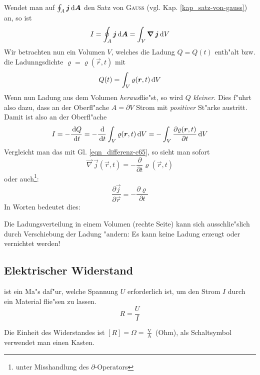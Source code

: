 Wendet man auf $\oint_A \boldsymbol{j} \, \mathrm{d} \boldsymbol{A}$ den Satz von
\textsc{Gauss} (vgl. Kap. \ref{kap_satz-von-gauss}) an, so ist
\begin{equation}
   \label{eqn_differenz-c65}
 I = \oint_A \boldsymbol{j} \, \mathrm{d} \boldsymbol{A} = \int_V \boldsymbol{\nabla} \, \boldsymbol{j} \, \mathrm{d} V
\end{equation}
Wir betrachten nun ein Volumen $V$, welches die Ladung $Q = Q(t)$
enth"alt bzw. die Ladunngsdichte $\varrho = \varrho(\vec r,t)$ mit
\begin{equation*}
   Q(t) = \int_V \varrho(\boldsymbol{r}, t) \, \mathrm{d} V
\end{equation*}
Wenn nun Ladung aus dem Volumen \emph{heraus}flie"st, so wird $Q$
\emph{kleiner}. Dies f"uhrt also dazu, dass an der Oberfl"ache $A
= \partial V$ Strom mit \emph{positiver} St"arke austritt. Damit ist
also an der Oberfl"ache
\begin{equation}
   \label{eqn_differenz-c67}
    I = - \frac{\, \mathrm{d} Q}{\, \mathrm{d} t} = -\frac{\, \mathrm{d} }{\, \mathrm{d} t} \int_V
   \varrho(\boldsymbol{r},t) \, \mathrm{d} V = -\int_V \frac{\partial \varrho(\boldsymbol{r},t)}{\partial t} \, \mathrm{d} V
\end{equation}
Vergleicht man das mit Gl. \eqref{eqn_differenz-c65}, so sieht man sofort
\begin{equation}
   \label{eqn_differenz-c64}
   \boxed{ \vec \nabla \, \vec j(\vec r,t) = - \frac{\partial }{\partial t}
     \varrho(\vec r,t)  }
\end{equation}
oder auch\footnote{unter Misshandlung des $\partial$-Operators}:
\begin{equation*}
   \frac{\partial \vec j}{\partial \vec r} = - \frac{\partial \varrho}{\partial t}
\end{equation*}
In Worten bedeutet dies:
\begin{Wichtig}
   Die Ladungsverteilung in einem Volumen (rechte Seite) kann sich
   ausschlie"slich durch Verschiebung der Ladung "andern: Es kann keine
   Ladung erzeugt oder vernichtet werden!
\end{Wichtig}






\subsection{Elektrischer Widerstand}
\label{kap_elektrischer-widerstand}

\begin{Def}
    ist ein Ma"s daf"ur, welche
   Spannung $U$ erforderlich ist, um den Strom $I$ durch ein Material
   flie"sen zu lassen.
   \begin{equation}
      \label{eqn_differenz-c66}
      R = \frac{U}{I}
   \end{equation}
\end{Def}
Die Einheit des Widerstandes ist $[R] = \Omega =
\frac{\operatorname{V}}{\operatorname{A}}$ (Ohm), als
Schaltsymbol verwendet man einen
Kasten.

